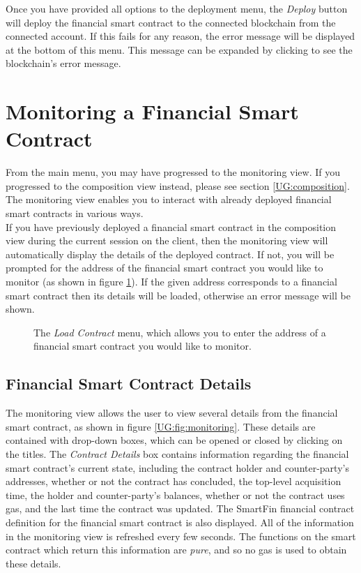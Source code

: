 Once you have provided all options to the deployment menu, the \textit{Deploy} button will deploy the financial smart contract to the connected blockchain from the connected account. If this fails for any reason, the error message will be displayed at the bottom of this menu. This message can be expanded by clicking to see the blockchain's error message.


\section{Monitoring a Financial Smart Contract} \label{UG:monitoring}

From the main menu, you may have progressed to the monitoring view. If you progressed to the composition view instead, please see section \ref{UG:composition}. The monitoring view enables you to interact with already deployed financial smart contracts in various ways. \\

If you have previously deployed a financial smart contract in the composition view during the current session on the client, then the monitoring view will automatically display the details of the deployed contract. If not, you will be prompted for the address of the financial smart contract you would like to monitor (as shown in figure \ref{UG:fig:monitoring-load}). If the given address corresponds to a financial smart contract then its details will be loaded, otherwise an error message will be shown.

\begin{figure}[h]
    \centering
    \caption{The \textit{Load Contract} menu, which allows you to enter the address of a financial smart contract you would like to monitor.}
    \label{UG:fig:monitoring-load}
\end{figure}

\subsection{Financial Smart Contract Details}

The monitoring view allows the user to view several details from the financial smart contract, as shown in figure \ref{UG:fig:monitoring}. These details are contained with drop-down boxes, which can be opened or closed by clicking on the titles. The \textit{Contract Details} box contains information regarding the financial smart contract's current state, including the contract holder and counter-party's addresses, whether or not the contract has concluded, the top-level acquisition time, the holder and counter-party's balances, whether or not the contract uses gas, and the last time the contract was updated. The SmartFin financial contract definition for the financial smart contract is also displayed. All of the information in the monitoring view is refreshed every few seconds. The functions on the smart contract which return this information are \textit{pure}, and so no gas is used to obtain these details.

